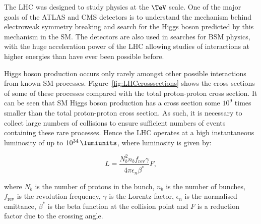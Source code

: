The LHC was designed to study physics at the $\TeV$ scale. One of the major
goals of the ATLAS and CMS detectors is to understand the mechanism behind
electroweak symmetry breaking and search for the Higgs boson predicted by this
mechanism in the \ac{SM}. The detectors are also used in searches for \ac{BSM}
physics, with the huge acceleration power of the LHC allowing studies of 
interactions at higher energies than have ever been possible before. 

Higgs boson production occurs only rarely amongst other possible interactions from known
\ac{SM} processes. Figure~\ref{fig:LHCcrosssections} shows the cross sections of
some of these processes compared with the total proton-proton cross section. It can be
seen that \ac{SM} Higgs boson production has a cross section some $10^{9}$ times
smaller than the total proton-proton cross section. 
As such, it is necessary to collect large numbers of
collisions to ensure sufficient numbers of events containing these rare
processes. Hence the LHC operates at a high instantaneous luminosity of up to
$10^{34}\,\lumiunits$, where luminosity is given by:

\begin{equation}
L=\frac{N_{b}^{2}n_{b}f_{\text{rev}}\gamma}{4\pi\epsilon_{n}\beta^{*}}F,
\end{equation}

where $N_{b}$ is the number of protons in the bunch, $n_{b}$ is the number of
bunches, $f_\text{rev}$ is the revolution frequency, $\gamma$ is the Lorentz
factor, $\epsilon_{n}$ is the normalised emittance, $\beta^{*}$ is the beta
function at the collision point and $F$ is a reduction factor due to the
crossing angle.

